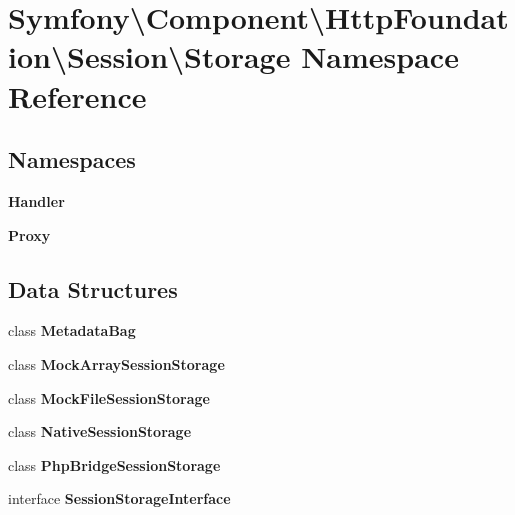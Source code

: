 \section{Symfony\textbackslash{}Component\textbackslash{}Http\+Foundation\textbackslash{}Session\textbackslash{}Storage Namespace Reference}
\label{namespace_symfony_1_1_component_1_1_http_foundation_1_1_session_1_1_storage}
\subsection*{Namespaces}
\begin{DoxyCompactItemize}
\item 
 {\bf Handler}
\item 
 {\bf Proxy}
\end{DoxyCompactItemize}
\subsection*{Data Structures}
\begin{DoxyCompactItemize}
\item 
class {\bf Metadata\+Bag}
\item 
class {\bf Mock\+Array\+Session\+Storage}
\item 
class {\bf Mock\+File\+Session\+Storage}
\item 
class {\bf Native\+Session\+Storage}
\item 
class {\bf Php\+Bridge\+Session\+Storage}
\item 
interface {\bf Session\+Storage\+Interface}
\end{DoxyCompactItemize}
